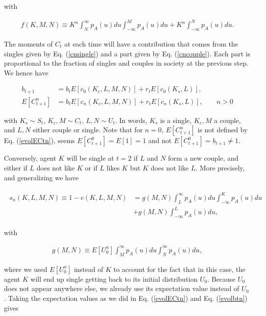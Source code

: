 \documentclass[12pt]{article}
\begin{document}
\noindent with 

\begin{align}
    f(K,M,N)\equiv K^n\int_{N}^\infty p_A(u)du\int_{-\infty}^{M}p_A(u)du+ K^n\int_{-\infty}^{N}p_A(u)du.
\end{align}

\noindent The moments of $C_{t}$ at each time will have a contribution that comes from the singles given by Eq. (\ref{cnsingle}) and a part given by Eq. (\ref{cncouple}). Each part is proportional to the fraction of singles and couples in society at the previous step. We hence have

\begin{align}
    b_{t+1} & =b_{t}E[c_0(K_c,L,M,N)]+r_tE[c_0(K_s,L)],\label{evolbtn}\\
    E[C_{t+1}^n] & =b_{t}E[c_n(K_c,L,M,N)]+r_tE[c_n(K_s,L)],\qquad n>0\label{evolECtn}
\end{align}

\noindent with $K_s\sim S_t$, $K_c,M\sim C_t$, $L,N\sim U_t$. In words, $K_s$ is a single, $K_c,M$ a couple, and $L,N$ either couple or single. Note that for $n=0$, $E[C_{t+1}^n]$ is not defined by Eq. (\ref{evolECtn}), seems $E[C_{t+1}^0]=E[1]=1$ and not $E[C_{t+1}^0]=b_{t+1}\neq1$.

Conversely, agent $K$ will be single at $t=2$ if $L$ and $N$ form a new couple, and either if $L$ does not like $K$ or if $L$ likes $K$ but $K$ does not like $L$. More precisely, and generalizing we have

\begin{align}
    \begin{split}
    s_n(K,L,M,N)\equiv 1-c(K,L,M,N) & =g(M,N)\int_{L}^\infty p_A(u)du\int_{-\infty}^{K}p_A(u)du\\
    & +g(M,N)\int_{-\infty}^{L} p_A(u)du,
    \end{split}    
    \label{coupled}
\end{align}

\noindent with

\begin{align}
    g(M,N)\equiv E[U_0^n]\int_{M}^\infty p_A(u)du\int_{N}^\infty p_A(u)du,
\end{align}

\noindent where we used $E[U_0^n]$ instead of $K$ to account for the fact that in this case, the agent $K$ will end up single getting back to its initial distribution $U_0$. Because $U_0$ does not appear anywhere else, we already use its expectation value instead of $U_0$. Taking the expectation values as we did in Eq. (\ref{evolECtn}) and Eq. (\ref{evolbtn}) gives
\end{document}
